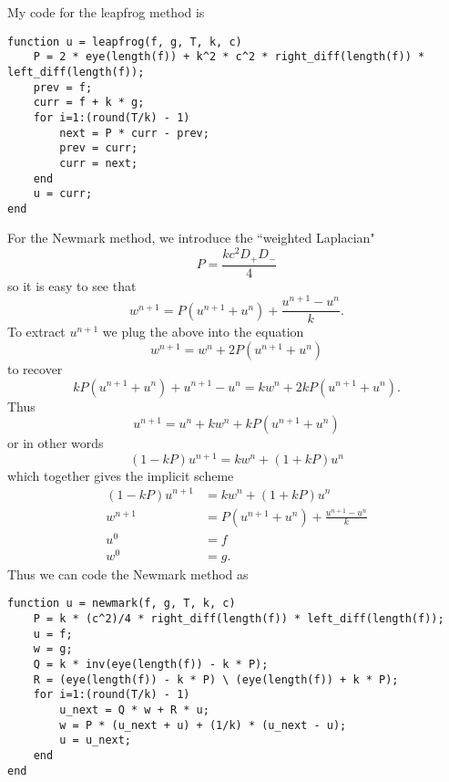 \documentclass[10pt]{article}
\theoremstyle{definition}
\begin{document}
My code for the leapfrog method is
\begin{verbatim}
function u = leapfrog(f, g, T, k, c)
    P = 2 * eye(length(f)) + k^2 * c^2 * right_diff(length(f)) * left_diff(length(f));
    prev = f;
    curr = f + k * g;
    for i=1:(round(T/k) - 1)
        next = P * curr - prev;
        prev = curr;
        curr = next;
    end
    u = curr;
end
\end{verbatim}
For the Newmark method, we introduce the ``weighted Laplacian"
$$P = \frac{kc^2 D_+ D_-}{4}$$
so it is easy to see that
$$w^{n + 1} = P(u^{n + 1} + u^n) + \frac{u^{n + 1} - u^n}{k}.$$
To extract $u^{n + 1}$ we plug the above into the equation
$$w^{n + 1} = w^n + 2P(u^{n + 1} + u^n)$$
to recover
$$kP(u^{n + 1} + u^n) + u^{n + 1} - u^n = kw^n + 2kP(u^{n + 1} + u^n).$$
Thus
$$u^{n + 1} = u^n + kw^n + kP(u^{n + 1} + u^n)$$
or in other words
$$(1 - kP)u^{n + 1} = kw^n + (1 + kP)u^n$$
which together gives the implicit scheme
\begin{align*}
(1 - kP)u^{n + 1} &= kw^n + (1 + kP)u^n \\
w^{n + 1} &= P(u^{n + 1} + u^n) + \frac{u^{n + 1} - u^n}{k}\\
u^0 &= f\\
w^0 &= g.
\end{align*}
Thus we can code the Newmark method as
\begin{verbatim}
function u = newmark(f, g, T, k, c)
    P = k * (c^2)/4 * right_diff(length(f)) * left_diff(length(f));
    u = f;
    w = g;
    Q = k * inv(eye(length(f)) - k * P);
    R = (eye(length(f)) - k * P) \ (eye(length(f)) + k * P);
    for i=1:(round(T/k) - 1)
        u_next = Q * w + R * u;
        w = P * (u_next + u) + (1/k) * (u_next - u);
        u = u_next;
    end
end
\end{verbatim}
\end{document}
